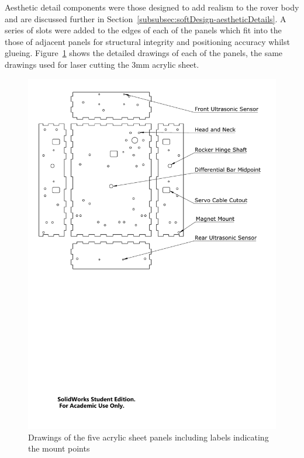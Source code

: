      Aesthetic detail components were those designed to add realism to the rover body and are discussed further in Section~\ref{subsubsec:softDesign-aestheticDetails}. A series of slots were added to the edges of each of the panels which fit into the those of adjacent panels for structural integrity and positioning accuracy whilst glueing. Figure~\ref{fig:mechDesign-perspex} shows the detailed drawings of each of the panels, the same drawings used for laser cutting the 3mm acrylic sheet.
      
      \begin{figure}[h!]
        \centering
        \includegraphics[clip, trim=0cm 13cm 1cm 0cm, width=1\linewidth]{figures/perspex}
        \caption[Drawings of the five acrylic sheet panels including labels indicating the mount points]{Drawings of the five acrylic sheet panels including labels indicating the mount points}
        \label{fig:mechDesign-perspex}
      \end{figure}
      
